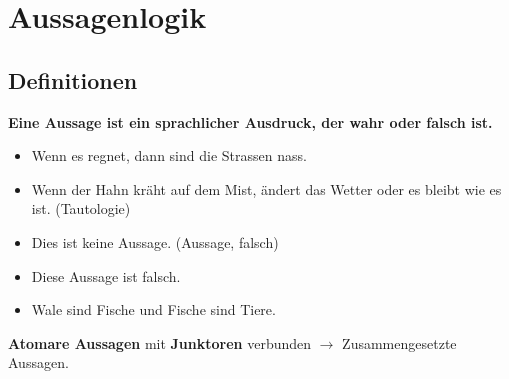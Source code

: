 \section{Aussagenlogik}
\subsection{Definitionen}
\begin{def*}[note = Aussage , index = Aussage]
	\textbf{Eine Aussage ist ein sprachlicher Ausdruck, der wahr oder falsch ist.}
\end{def*}
\begin{bsp*}
	\begin{itemize}
		\item Wenn es regnet, dann sind die Strassen nass.
		\item Wenn der Hahn kräht auf dem Mist, ändert das Wetter oder es bleibt wie es ist.     (Tautologie)
		\item Dies ist keine Aussage. \qquad (Aussage, falsch)
		\item Diese Aussage ist falsch.
		\item Wale sind Fische und Fische sind Tiere.
	\end{itemize}
\end{bsp*}
\textbf{Atomare Aussagen} mit \textbf{Junktoren} verbunden $\rightarrow$ Zusammengesetzte Aussagen.

